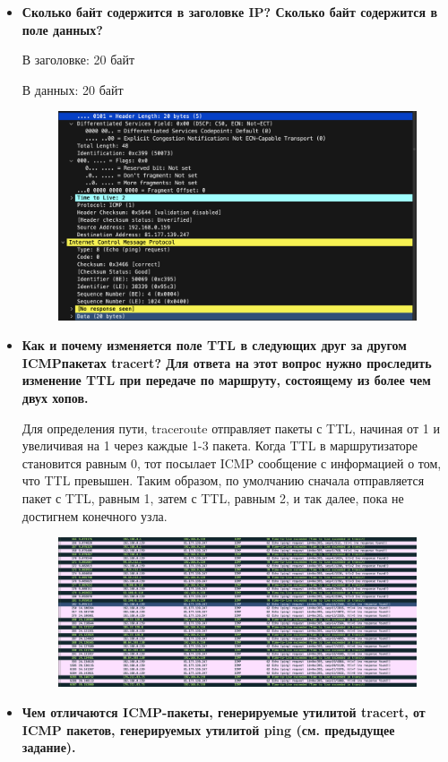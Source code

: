 \documentclass[12pt,onecolumn]{article}
\begin{document}
\begin{itemize}
    \item {
        \textbf{Сколько байт содержится в заголовке IP? Сколько байт содержится в поле данных?}

        В заголовке: 20 байт

        В данных: 20 байт

        \begin{figure}[H]
            \centering
            \includegraphics*[width=\textwidth]{image/part2/ip-size.png}
        \end{figure}
    }
    \item{
        \textbf{Как и почему изменяется поле TTL в следующих друг за другом ICMPпакетах tracert? Для ответа на этот вопрос нужно проследить изменение TTL при передаче по маршруту, состоящему из более чем двух хопов.}
    
        Для определения пути, traceroute отправляет пакеты с TTL, начиная от 1 и увеличивая на 1 через каждые 1-3 пакета.
        Когда TTL в маршрутизаторе становится равным 0, тот посылает ICMP сообщение с информацией о том, что TTL превышен. Таким образом, по умолчанию сначала отправляется пакет с TTL, равным 1, затем с TTL, равным 2, и так далее, пока не достигнем конечного узла.
        \begin{figure}[H]
            \centering
            \includegraphics*[width=\textwidth]{image/part2/ttl-exceeded.png}
        \end{figure}
        }
    \item{
        \textbf{Чем отличаются ICMP-пакеты, генерируемые утилитой tracert, от ICMP пакетов, генерируемых утилитой ping (см. предыдущее задание).}

}
\end{itemize}
\end{document}
